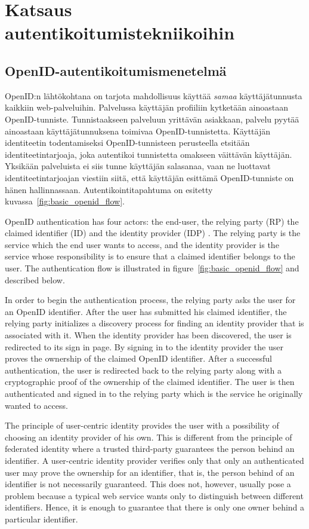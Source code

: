 \documentclass[english,gradu]{tktltiki}
\begin{document}
\section{Katsaus autentikoitumistekniikoihin}

\subsection{OpenID-autentikoitumismenetelmä}
\label{sec:openid_auth}

OpenID:n lähtökohtana on tarjota mahdollisuus käyttää \emph{samaa} käyttäjätunnusta kaikkiin web-palveluihin.
Palvelussa käyttäjän profiiliin kytketään ainoastaan OpenID-tunniste. Tunnistaakseen palveluun yrittävän asiakkaan, palvelu pyytää ainoastaan käyttäjätunnuksena toimivaa OpenID-tunnistetta. Käyttäjän identiteetin todentamiseksi OpenID-tunnisteen perusteella etsitään identiteetintarjoaja, joka autentikoi tunnistetta omakseen väittävän käyttäjän. Yksikään palveluista ei siis tunne käyttäjän salasanaa, vaan ne luottavat identiteetintarjoajan viestiin siitä, että käyttäjän esittämä OpenID-tunniste on hänen hallinnassaan. Autentikointitapahtuma on esitetty kuvassa~\ref{fig:basic_openid_flow}.

OpenID authentication has four actors: the end-user, the relying party (RP) the claimed identifier (ID) and the identity provider (IDP) \cite{openid_2.0_platform_2009}. The relying party is the service which the end user wants to access, and the identity provider is the service whose responsibility is to ensure that a claimed identifier belongs to the user. The authentication flow is illustrated in figure~\ref{fig:basic_openid_flow} and described below.

In order to begin the authentication process, the relying party asks the user for an OpenID identifier. After the user has submitted his claimed identifier, the relying party initializes a discovery process for finding an identity provider that is associated with it. When the identity provider has been discovered, the user is redirected to its sign in page. By signing in to the identity provider the user proves the ownership of the claimed OpenID identifier. After a successful authentication, the user is redirected back to the relying party along with a cryptographic proof of the ownership of the claimed identifier. The user is then authenticated and signed in to the relying party which is the service he originally wanted to access.

The principle of user-centric identity provides the user with a possibility of choosing an identity provider of his own. This is different from the principle of federated identity where a trusted third-party guarantees the person behind an identifier. A user-centric identity provider verifies only that only an authenticated user may prove the ownership for an identifier, that is, the person behind of an identifier is not necessarily guaranteed. This does not, however, usually pose a problem because a typical web service wants only to distinguish between different identifiers. Hence, it is enough to guarantee that there is only one owner behind a particular identifier.
\end{document}
